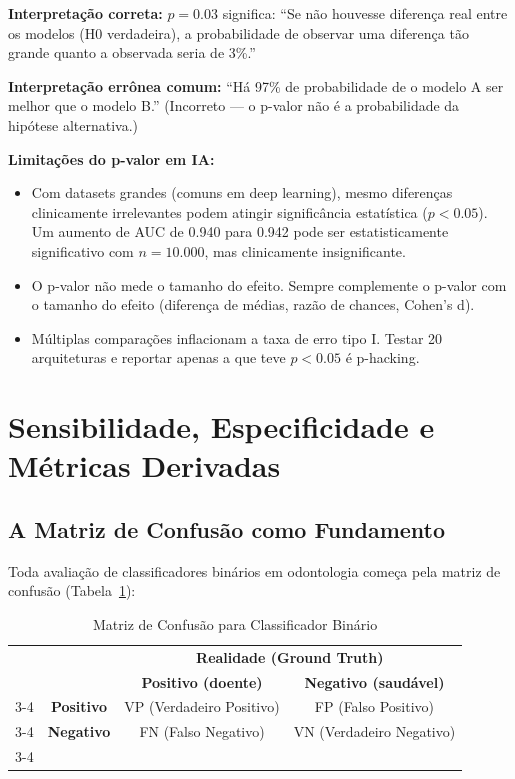 \textbf{Interpretação correta:} $p = 0.03$ significa: ``Se não houvesse diferença real entre os modelos (H0 verdadeira), a probabilidade de observar uma diferença tão grande quanto a observada seria de 3\%.''

\textbf{Interpretação errônea comum:} ``Há 97\% de probabilidade de o modelo A ser melhor que o modelo B.'' (Incorreto — o p-valor não é a probabilidade da hipótese alternativa.)

\textbf{Limitações do p-valor em IA:}
\begin{itemize}
    \item Com datasets grandes (comuns em deep learning), mesmo diferenças clinicamente irrelevantes podem atingir significância estatística ($p < 0.05$). Um aumento de AUC de 0.940 para 0.942 pode ser estatisticamente significativo com $n = 10.000$, mas clinicamente insignificante.
    \item O p-valor não mede o tamanho do efeito. Sempre complemente o p-valor com o tamanho do efeito (diferença de médias, razão de chances, Cohen's d).
    \item Múltiplas comparações inflacionam a taxa de erro tipo I. Testar 20 arquiteturas e reportar apenas a que teve $p < 0.05$ é p-hacking.
\end{itemize}

\section{Sensibilidade, Especificidade e Métricas Derivadas}

\subsection{A Matriz de Confusão como Fundamento}

Toda avaliação de classificadores binários em odontologia começa pela matriz de confusão  (Tabela~\ref{tab:matriz-confusao}):

\begin{table}[H]
  \centering
  \caption{Matriz de Confusão para Classificador Binário}
  \label{tab:matriz-confusao}
  \begin{tabular}{cc|c|c|}
    \multicolumn{2}{c}{} & \multicolumn{2}{c}{\textbf{Realidade (Ground Truth)}} \\
    \multicolumn{2}{c}{} & \textbf{Positivo (doente)} & \textbf{Negativo (saudável)} \\
    \cline{3-4}
    \multirow{2}{*}{\textbf{Predição}} & \textbf{Positivo} & VP (Verdadeiro Positivo) & FP (Falso Positivo) \\
    \cline{3-4}
    & \textbf{Negativo} & FN (Falso Negativo) & VN (Verdadeiro Negativo) \\
    \cline{3-4}
  \end{tabular}
\end{table}

